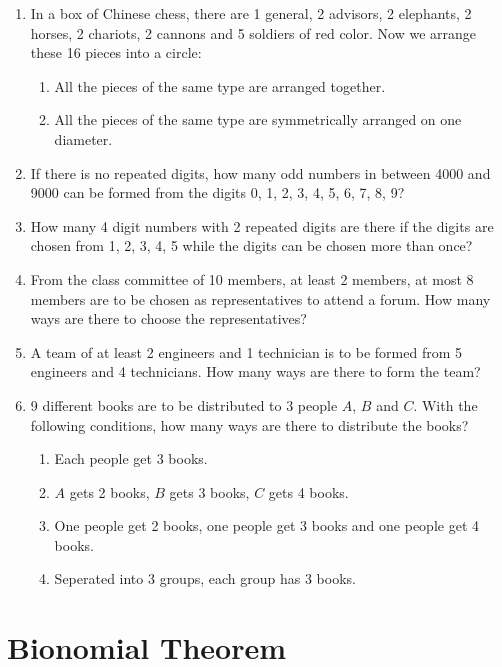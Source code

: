\documentclass{report}
\begin{document}
\begin{multicols}{2}
\begin{enumerate}
    \item In a box of Chinese chess, there are 1 general, 2 advisors, 2 elephants, 2
          horses, 2 chariots, 2 cannons and 5 soldiers of red color. Now we arrange these
          16 pieces into a circle:
          \begin{enumerate}
            \item All the pieces of the same type are arranged together.
            \item All the pieces of the same type are symmetrically arranged on one diameter.
          \end{enumerate}

    \item If there is no repeated digits, how many odd numbers in between 4000 and 9000
          can be formed from the digits 0, 1, 2, 3, 4, 5, 6, 7, 8, 9?

    \item How many 4 digit numbers with 2 repeated digits are there if the digits are
          chosen from 1, 2, 3, 4, 5 while the digits can be chosen more than once?

    \item From the class committee of 10 members, at least 2 members, at most 8 members
          are to be chosen as representatives to attend a forum. How many ways are there
          to choose the representatives?

    \item A team of at least 2 engineers and 1 technician is to be formed from 5
          engineers and 4 technicians. How many ways are there to form the team?

    \item 9 different books are to be distributed to 3 people $A$, $B$ and $C$. With the following conditions, how many ways are there to distribute the books?
          \begin{enumerate}
            \item Each people get 3 books.
            \item $A$ gets 2 books, $B$ gets 3 books, $C$ gets 4 books.
            \item One people get 2 books, one people get 3 books and one people get 4 books.
            \item Seperated into 3 groups, each group has 3 books.
          \end{enumerate}
  \end{enumerate}

  \chapter{Bionomial Theorem}


\end{multicols}
\end{document}
